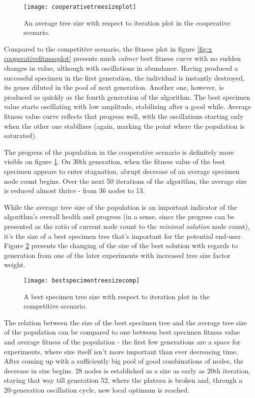 \begin{figure}[h]
    \centering
    \texttt{[image: cooperativetreesizeplot]}
    \caption{An average tree size with respect to iteration plot in the cooperative scenario.}
    \label{fig:x cooperativetreesizeplot}
\end{figure}

Compared to the competitive scenario, the fitness plot in figure \ref{fig:x cooperativefitnessplot} presents much \textit{calmer} best fitness curve with no sudden changes in value, although with oscillations in abundance. Having produced a successful specimen in the first generation, the individual is instantly destroyed, its genes diluted in the pool of next generation. Another one, however, is produced as quickly as the fourth generation of the algorithm. The best specimen value starts oscillating with low amplitude, stabilizing after a good while. Average fitness value curve reflects that progress well, with the oscillations starting only when the other one stabilizes (again, marking the point where the population is saturated).

The progress of the population in the cooperative scenario is definitely more visible on figure \ref{fig:x cooperativetreesizeplot}. On 30th generation, when the fitness value of the best specimen appears to enter stagnation, abrupt decrease of an average specimen node count begins. Over the next 50 iterations of the algorithm, the average size is reduced almost thrice - from 36 nodes to 13.

While the average tree size of the population is an important indicator of the algorithm's overall health and progress (in a sense, since the progress can be presented as the ratio of current node count to the \textit{minimal solution} node count), it's the size of a best specimen tree that's important for the potential end-user. Figure \ref{fig:x competitivebestspecimentreesizeplot} presents the changing of the size of the best solution with regards to generation from one of the later experiments with increased tree size factor weight.

\begin{figure}[H]
    \centering
    \texttt{[image: bestspecimentreesizecomp]}
    \caption{A best specimen tree size with respect to iteration plot in the competitive scenario.}
    \label{fig:x competitivebestspecimentreesizeplot}
\end{figure}

The relation between the size of the best specimen tree and the average tree size of the population can be compared to one between best specimen fitness value and average fitness of the population - the first few generations are a space for experiments, where size itself isn't more important than ever decreasing time. After coming up with a sufficiently big pool of good combinations of nodes, the decrease in size begins. 28 nodes is established as a size as early as 20th iteration, staying that way till generation 52, where the plateau is broken and, through a 20-generation oscillation cycle, new local optimum is reached.

